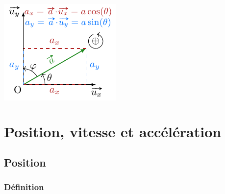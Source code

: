 \documentclass[../../main/main.tex]{subfiles}
\begin{document}
\begin{tcb*}[sidebyside, righthand ratio=.4]
\begin{center}
{			\includegraphics[width=\linewidth]{proj}
		}
		\vspace{-15pt}
	\end{center}
\end{tcb*}


\section{Position, vitesse et accélération}
\subsection{Position}
\subsubsection{Définition}
\end{document}
